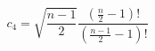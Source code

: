 \documentclass[12pt]{article}
\begin{document}
\pagestyle{empty}
\Large
{}
\pagecolor{ehandbook}

\boldmath
\[
c_{4} = \sqrt{\frac{n-1}{2}} 
\frac{\left( \frac{n}{2} - 1 \right) !}
 {\left( \frac{n-1}{2} - 1 \right) ! }
\]
\end{document}
